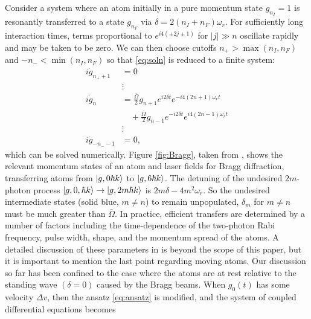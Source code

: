\documentclass[reprint,
nofootinbib,
amsmath,amssymb,
aps]{revtex4-1}
\newcommand{\f}[2]{\frac{#1}{#2}}
\newcommand{\lb}{\left[}
\newcommand{\rb}{\right]}
\begin{document}
Consider a system where an atom initially in a pure momentum state $g_{n_I} = 1$ is resonantly transferred to a state $g_{n_F}$ via $\delta = 2(n_I + n_F)\omega_r$. For sufficiently long interaction times, terms proportional to $e^{i4(\pm 2j \pm  1)}$ for $|j|\gg n$ oscillate rapidly and may be taken to be zero. We can then choose cutoffs $n_+ > \max(n_I, n_F)$ and $-n_- < \min(n_I, n_F)$ so that \eqref{eq:soln} is reduced to a  finite system:
\begin{align*}
i\dot{g}_{n_++1} &= 0\\
&\vdots\\
i\dot{g}_{n} &= \f{\bar{\Omega}}{2} g_{n+1} e^{i2\delta t} e^{-i4(2n+1)\omega_r t}\\ 
&\quad+ \f{\bar{\Omega}}{2}g_{n-1} e^{-i2\delta t} e^{i4(2n-1)\omega_rt}\\
&\vdots\\
i\dot{g}_{-n_--1} &= 0,
\end{align*}
which can be solved numerically. Figure \ref{fig:Bragg}, taken from \cite{estey2016precision}, shows the relevant momentum states of an atom and laser fields for Bragg diffraction, transferring atoms from $\ket{g,0\hbar k}$ to $\ket{g,6\hbar k}$. The detuning of the undesired $2m$-photon process $\ket{g,0,\hbar k} \to \ket{g,2m\hbar k}$ is $2m\delta - 4m^2 \omega_r$. So the undesired intermediate states (solid blue, $m\neq n$) to remain unpopulated, $\delta_m$ for $m\neq n$ must be much greater than $\bar{\Omega}$. In practice, efficient transfers are determined by a number of factors including the time-dependence of the two-photon Rabi frequency, pulse width, shape, and the momentum spread of the atoms. A detailed discussion of these parameters in \cite{estey2016precision} is beyond the scope of this paper, but it is important to mention the last point regarding moving atoms. Our discussion so far has been confined to the case where the atoms are at rest relative to the standing wave $(\delta = 0)$ caused by the Bragg beams. When $g_0(t)$ has some velocity $\Delta v$, then the ansatz \eqref{eq:ansatz} is modified, and the system of coupled differential equations becomes
\end{document}
